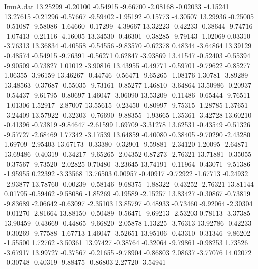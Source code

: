 \begin{filecontents}{ImuA.dat}
  13.25299   -0.20100   -0.54915   -9.66700   -2.08168   -0.02033   -4.15241
  13.27615   -0.21296   -0.57667   -9.59402   -1.95192   -0.15773   -4.30507
  13.29936   -0.25005   -0.51087   -9.58086   -1.64660   -0.17299   -4.39667
  13.32223   -0.42233   -0.38644   -9.74716   -1.07413   -0.21116   -4.16005
  13.34530   -0.46301   -0.38285   -9.79143   -1.02069    0.03310   -3.76313
  13.36834   -0.40558   -0.54556   -9.83570   -0.62378    0.48344   -3.64864
  13.39129   -0.48574   -0.54915   -9.76391   -0.56271    0.62847   -3.93869
  13.41547   -0.52403   -0.55394   -9.90509   -0.73827    1.01012   -3.90816
  13.43955   -0.49771   -0.59701   -9.79622   -0.85277    1.06355   -3.96159
  13.46267   -0.44746   -0.56471   -9.65265   -1.08176    1.30781   -3.89289
  13.48563   -0.37687   -0.55035   -9.73161   -0.85277    1.46810   -3.64864
  13.50986   -0.20937   -0.54437   -9.61795   -0.80697    1.46047   -3.06090
  13.53209   -0.11486   -0.65444   -9.76511   -1.01306    1.52917   -2.87007
  13.55615   -0.23450   -0.80997   -9.75315   -1.28785    1.37651   -3.24409
  13.57922   -0.32303   -0.76690   -9.88355   -1.93665    1.35361   -3.42728
  13.60210   -0.41396   -0.73819   -9.84647   -2.61599    1.69709   -3.31278
  13.62531   -0.43549   -0.51326   -9.57727   -2.68469    1.77342   -3.17539
  13.64859   -0.40080   -0.38405   -9.70290   -2.43280    1.69709   -2.95403
  13.67173   -0.33380   -0.32901   -9.59881   -2.34120    1.20095   -2.64871
  13.69486   -0.40319   -0.34217   -9.65265   -2.04352    0.87273   -2.76321
  13.71881   -0.35055   -0.37567   -9.73520   -2.02825    0.70480   -3.23645
  13.74191   -0.11964   -0.43071   -9.51386   -1.95955    0.22392   -3.33568
  13.76503    0.00957   -0.40917   -9.72922   -1.67713   -0.24932   -2.93877
  13.78760   -0.00239   -0.58146   -9.68375   -1.88322   -0.43252   -2.76321
  13.81144    0.01795   -0.59462   -9.58086   -1.85269   -0.19589   -2.15257
  13.83427   -0.30867   -0.73819   -9.83689   -2.06642   -0.63097   -2.35103
  13.85797   -0.48933   -0.73460   -9.92064   -2.30304   -0.01270   -2.81664
  13.88150   -0.50489   -0.56471   -9.69213   -2.53203    0.78113   -3.37385
  13.90459   -0.43669   -0.44865   -9.66820   -2.05878    1.13225   -3.76313
  13.92786   -0.42233   -0.30269   -9.77588   -1.67713    1.46047   -3.52651
  13.95106   -0.43310   -0.31346   -9.86202   -1.55500    1.72762   -3.50361
  13.97427   -0.38764   -0.32064   -9.79861   -0.98253    1.73526   -3.67917
  13.99727   -0.37567   -0.21655   -9.78904   -0.86803    2.08637   -3.77076
  14.02072   -0.30748   -0.40319   -9.88475   -0.86803    2.27720   -3.54941

\end{filecontents}
